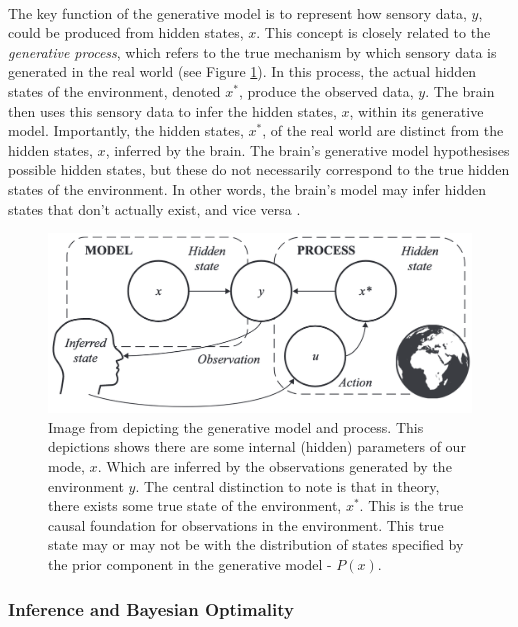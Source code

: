 \documentclass{article}
\begin{document}
\

The key function of the generative model is to represent how sensory data, $y$, could be produced from hidden states, $x$. This concept is closely related to the \textit{generative process}, which refers to the true mechanism by which sensory data is generated in the real world (see Figure \ref{fig:generative_process}). In this process, the actual hidden states of the environment, denoted $x^*$, produce the observed data, $y$. The brain then uses this sensory data to infer the hidden states, $x$, within its generative model. Importantly, the hidden states, $x^*$, of the real world are distinct from the hidden states, $x$, inferred by the brain. The brain’s generative model hypothesises possible hidden states, but these do not necessarily correspond to the true hidden states of the environment. In other words, the brain’s model may infer hidden states that don’t actually exist, and vice versa \citep{parr2022ActiveInference}.

\begin{figure}[htbp]
    \centering
    \includegraphics[scale=0.6]{images/generative_process.png}
    \caption{Image from \citet{parr2022ActiveInference} depicting the generative model and process. This depictions shows there are some internal (hidden) parameters of our mode, $x$. Which are inferred by the observations generated by the environment $y$. The central distinction to note is that in theory, there exists some true state of the environment, $x^*$. This is the true causal foundation for observations in the environment. This true state may or may not be with the distribution of states specified by the prior component in the generative model - $P(x)$.}
    \label{fig:generative_process} 
\end{figure}

\subsubsection{Inference and Bayesian Optimality}
\end{document}

